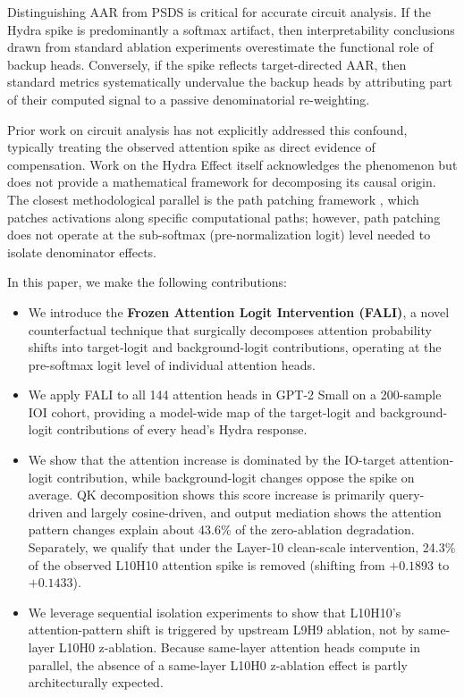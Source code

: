 \documentclass[12pt,a4paper]{article}
\begin{document}
Distinguishing AAR from PSDS is critical for accurate circuit analysis.
If the Hydra spike is predominantly a softmax artifact, then interpretability
conclusions drawn from standard ablation experiments overestimate the functional
role of backup heads. Conversely, if the spike reflects target-directed AAR, then
standard metrics systematically undervalue the backup heads by attributing part
of their computed signal to a passive denominatorial re-weighting.

Prior work on circuit analysis \citep{conmy2023automated, goldowsky2023localizing}
has not explicitly addressed this confound, typically treating the observed
attention spike as direct evidence of compensation. Work on the Hydra Effect
itself \citep{mcgrath2023hydra} acknowledges the phenomenon but does not provide
a mathematical framework for decomposing its causal origin. The closest
methodological parallel is the path patching framework \citep{goldowsky2023localizing},
which patches activations along specific computational paths; however, path
patching does not operate at the sub-softmax (pre-normalization logit) level
needed to isolate denominator effects.

In this paper, we make the following contributions:

\begin{itemize}
  \item We introduce the \textbf{Frozen Attention Logit Intervention (FALI)}, a
    novel counterfactual technique that surgically decomposes attention probability shifts into
    target-logit and background-logit contributions, operating at the pre-softmax
    logit level of individual attention heads.
  \item We apply FALI to all 144 attention heads in GPT-2 Small on a
    200-sample IOI cohort, providing a model-wide map of the target-logit and background-logit
    contributions of every head's Hydra response.
  \item We show that the attention increase is dominated by the IO-target attention-logit
    contribution, while background-logit changes oppose the spike on average. QK decomposition
    shows this score increase is primarily query-driven and largely cosine-driven, and output
    mediation shows the attention pattern changes explain about 43.6\% of the zero-ablation degradation.
    Separately, we qualify that under the Layer-10 clean-scale intervention, 24.3\% of the observed L10H10 attention spike is removed (shifting from $+0.1893$ to $+0.1433$).
  \item We leverage sequential isolation experiments to show that L10H10's attention-pattern shift is triggered by upstream L9H9 ablation, not by same-layer L10H0 z-ablation. Because same-layer attention heads compute in parallel, the absence of a same-layer L10H0 z-ablation effect is partly architecturally expected.
\end{itemize}
\end{document}
